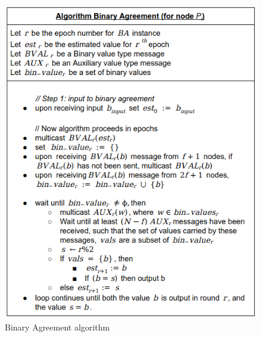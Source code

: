 \begin{figure}[!h]
    \centering
    \includegraphics[scale=0.7]{images/ba_algo.png}
    \caption{Binary Agreement algorithm\cite{miller2016honey}}
    \label{fig:ba_algo}
\end{figure}
